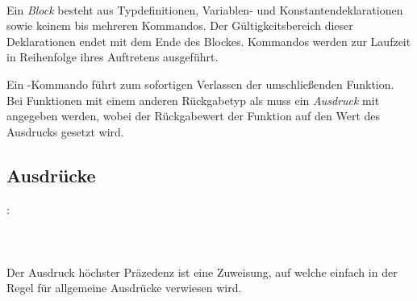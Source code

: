 \hspace*{1cm}\Gspace{} \Gspace\Gt{;}\\
\hspace*{1cm} \\
\hspace*{1cm} \\
\hspace*{1cm} \\
\hspace*{1cm}\Gt{\{}\Gspace\Gt{\}}\\
\hspace*{1cm}\Gt{\{}\Gspace{} \Gspace\Gt{\}}\\

Ein \emph{Block} besteht aus Typdefinitionen, Variablen- und Konstantendeklarationen sowie keinem bis mehreren Kommandos.
Der Gültigkeitsbereich dieser Deklarationen endet mit dem Ende des Blockes. Kommandos werden zur Laufzeit in Reihenfolge ihres
Auftretens ausgeführt.

Ein -Kommando führt zum sofortigen Verlassen der umschließenden Funktion.
Bei Funktionen mit einem anderen Rückgabetyp als  muss ein \emph{Ausdruck} mit angegeben
werden, wobei der Rückgabewert der Funktion auf den Wert des Ausdrucks gesetzt wird.

\subsection{Ausdrücke}\label{Ausdruecke}
:\label{ausdruck}\\
\hspace*{1cm} \\
\hspace*{1cm} \Gspace{} \\
\hspace*{1cm} \Gspace{} \\

Der Ausdruck höchster Präzedenz ist eine Zuweisung, auf welche einfach in der Regel für
allgemeine Ausdrücke verwiesen wird.


